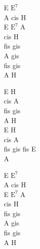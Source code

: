 \begin{chord}
    E $\mathrm{E^7}$\\
    A cis H\\
    E $\mathrm{E^7}$ A\\
    cis H\\
    fis gis\\
    A gis\\
    fis gis\\
    A H

    E H\\
    cis A\\
    fis gis\\
    A H\\
    E H\\
    cis A\\
    fis gis fis E\\
    A

    E $\mathrm{E^7}$\\
    A cis H\\
    E $\mathrm{E^7}$ A\\
    cis H\\
    fis gis\\
    A gis\\
    fis gis\\
    A H
\end{chord}
